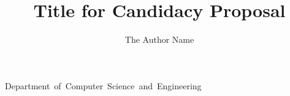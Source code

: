 \documentclass{osudissert96}
\begin{document}
%
%

\author{The Author Name}
\title{Title for Candidacy Proposal}
\unit{Department of Computer Science and Engineering}




\maketitle



%
%
\begin{small}

\begin{abstract}
    
\end{abstract}

\tableofcontents


\end{small}


\begin{normalsize}




\end{normalsize}


\begin{footnotesize}
\begin{spacing}{0.6}




\end{spacing}
\end{footnotesize}
\end{document}
